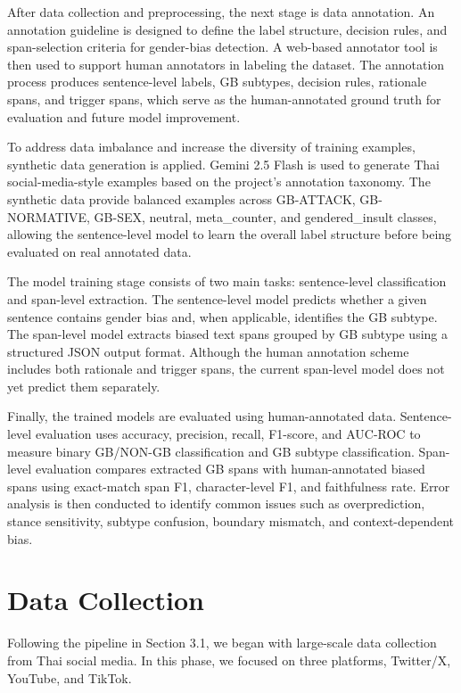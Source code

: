 \documentclass[12pt,oneside,openright,a4paper]{cpe-english-project}
\begin{document}
After data collection and preprocessing, the next stage is data annotation. An annotation guideline is designed to define the label structure, decision rules, and span-selection criteria for gender-bias detection. A web-based annotator tool is then used to support human annotators in labeling the dataset. The annotation process produces sentence-level labels, GB subtypes, decision rules, rationale spans, and trigger spans, which serve as the human-annotated ground truth for evaluation and future model improvement.

To address data imbalance and increase the diversity of training examples, synthetic data generation is applied. Gemini 2.5 Flash is used to generate Thai social-media-style examples based on the project's annotation taxonomy. The synthetic data provide balanced examples across GB-ATTACK, GB-NORMATIVE, GB-SEX, neutral, meta\_counter, and gendered\_insult classes, allowing the sentence-level model to learn the overall label structure before being evaluated on real annotated data.

The model training stage consists of two main tasks: sentence-level classification and span-level extraction. The sentence-level model predicts whether a given sentence contains gender bias and, when applicable, identifies the GB subtype. The span-level model extracts biased text spans grouped by GB subtype using a structured JSON output format. Although the human annotation scheme includes both rationale and trigger spans, the current span-level model does not yet predict them separately.

Finally, the trained models are evaluated using human-annotated data. Sentence-level evaluation uses accuracy, precision, recall, F1-score, and AUC-ROC to measure binary GB/NON-GB classification and GB subtype classification. Span-level evaluation compares extracted GB spans with human-annotated biased spans using exact-match span F1, character-level F1, and faithfulness rate. Error analysis is then conducted to identify common issues such as overprediction, stance sensitivity, subtype confusion, boundary mismatch, and context-dependent bias.

\section{Data Collection}

Following the pipeline in Section 3.1, we began with large-scale data collection from Thai social media. In this phase, we focused on three platforms, Twitter/X, YouTube, and TikTok.
\end{document}

